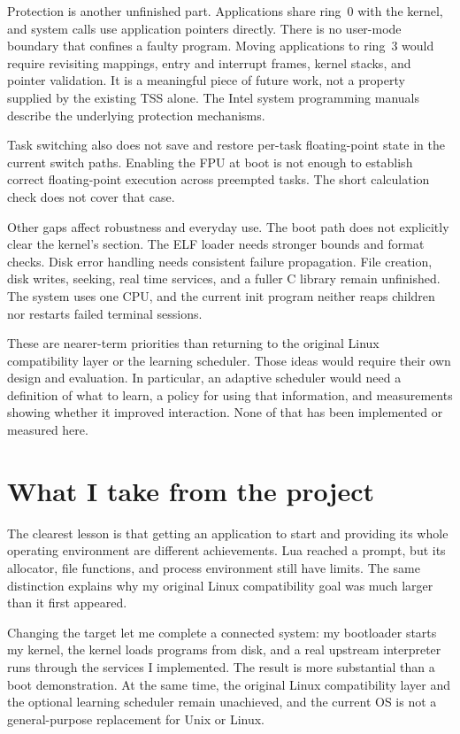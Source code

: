 \documentclass[11pt,a4paper]{scrartcl}
\newcommand{\code}[1]{\texttt{\detokenize{#1}}}
\begin{document}
Protection is another unfinished part. Applications share ring~0 with the
kernel, and system calls use application pointers directly. There is no
user-mode boundary that confines a faulty program. Moving applications
to ring~3 would require revisiting mappings, entry and interrupt frames,
kernel stacks, and pointer validation. It is a meaningful piece of future
work, not a property supplied by the existing TSS alone. The Intel system
programming manuals describe the underlying protection mechanisms.\cite{intel}

Task switching also does not save and restore per-task floating-point
state in the current switch paths. Enabling the FPU at boot is not enough
to establish correct floating-point execution across preempted tasks. The
short calculation check does not cover that case.

Other gaps affect robustness and everyday use. The boot path does not
explicitly clear the kernel's \code{.bss} section. The ELF loader needs
stronger bounds and format checks. Disk error handling needs consistent
failure propagation. File creation, disk writes, seeking, real time
services, and a fuller C library remain unfinished. The system uses one
CPU, and the current init program neither reaps children nor restarts
failed terminal sessions.

These are nearer-term priorities than returning to the original Linux
compatibility layer or the learning scheduler. Those ideas would require
their own design and evaluation. In particular, an adaptive scheduler
would need a definition of what to learn, a policy for using that
information, and measurements showing whether it improved interaction.
None of that has been implemented or measured here.


\section{What I take from the project}

The clearest lesson is that getting an application to start and providing
its whole operating environment are different achievements. Lua reached
a prompt, but its allocator, file functions, and process environment still
have limits. The same distinction explains why my original Linux
compatibility goal was much larger than it first appeared.

Changing the target let me complete a connected system: my bootloader
starts my kernel, the kernel loads programs from disk, and a real upstream
interpreter runs through the services I implemented. The result is more
substantial than a boot demonstration. At the same time, the original
Linux compatibility layer and the optional learning scheduler remain
unachieved, and the current OS is not a general-purpose replacement for
Unix or Linux.
\end{document}
